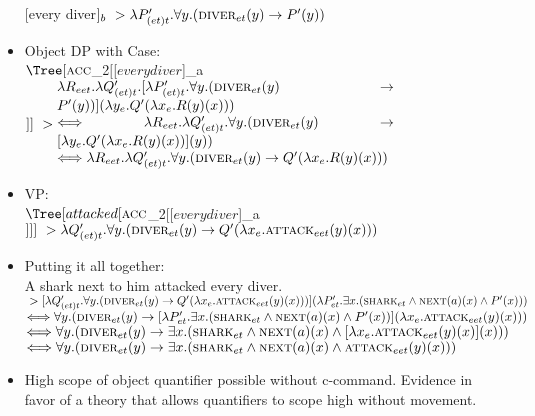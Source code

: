 \documentclass[a4paper]{article}
\begin{document}
\begin{itemize}
	$[$every diver$]_b ~> \lambda P'_{(et)t}. \forall y.(\textsc{diver}_{et}(y) -> P'(y))$

	\item Object DP with Case:\\

	$\Tree [\textsc{acc}$_2$ [ $[$every diver$]_a$ ] ] ~> \parbox{.7\textwidth}{$\lambda R_{eet}. \lambda Q'_{(et)t}.[\lambda P'_{(et)t}. \forall y.(\textsc{diver}_{et}(y) -> P'(y))](\lambda y_e.Q'(\lambda x_e.R(y)(x)))\\
	<=> \lambda R_{eet}. \lambda Q'_{(et)t}.\forall y.(\textsc{diver}_{et}(y) -> [\lambda y_e.Q'(\lambda x_e.R(y)(x))](y))\\
	<=> \lambda R_{eet}. \lambda Q'_{(et)t}.\forall y.(\textsc{diver}_{et}(y) -> Q'(\lambda x_e.R(y)(x)))
	$
	}$



	\item VP:\\

	$\Tree [attacked [\textsc{acc}$_2$ [ $[$every diver$]_a$ ] ] ] ~> \lambda Q'_{(et)t}.\forall y.(\textsc{diver}_{et}(y) -> Q'(\lambda x_e.\textsc{attack}_{eet}(y)(x)))$

	\item Putting it all together:\\
	A shark next to him attacked every diver.\\
	$~> [\lambda Q'_{(et)t}.\forall y.(\textsc{diver}_{et}(y) -> Q'(\lambda x_e.\textsc{attack}_{eet}(y)(x)))](\lambda P'_{et}.\exists x.(\textsc{shark}_{et} \land \textsc{next}(a)(x) \land P^\prime(x)))$
	\\$<=> \forall y.(\textsc{diver}_{et}(y) -> [\lambda P'_{et}.\exists x.(\textsc{shark}_{et} \land \textsc{next}(a)(x) \land P^\prime(x))](\lambda x_e.\textsc{attack}_{eet}(y)(x)))$
	\\$<=> \forall y.(\textsc{diver}_{et}(y) -> \exists x.(\textsc{shark}_{et} \land \textsc{next}(a)(x) \land [\lambda x_e.\textsc{attack}_{eet}(y)(x)](x)))$
	\\$<=> \forall y.(\textsc{diver}_{et}(y) -> \exists x.(\textsc{shark}_{et} \land \textsc{next}(a)(x) \land \textsc{attack}_{eet}(y)(x)))$

	\item High scope of object quantifier possible without c-command. Evidence in favor of a theory that allows quantifiers to scope high without movement.
\end{itemize}
\end{document}
